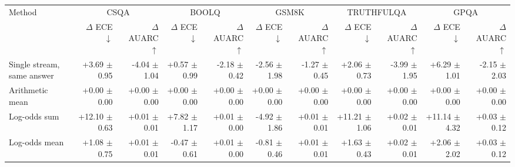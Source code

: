 \begin{tabular}{lrrrrrrrrrr}
\toprule
Method & \multicolumn{2}{c}{CSQA} & \multicolumn{2}{c}{BOOLQ} & \multicolumn{2}{c}{GSM8K} & \multicolumn{2}{c}{TRUTHFULQA} & \multicolumn{2}{c}{GPQA} \\
 & $\Delta$ ECE $\downarrow$ & $\Delta$ AUARC $\uparrow$ & $\Delta$ ECE $\downarrow$ & $\Delta$ AUARC $\uparrow$ & $\Delta$ ECE $\downarrow$ & $\Delta$ AUARC $\uparrow$ & $\Delta$ ECE $\downarrow$ & $\Delta$ AUARC $\uparrow$ & $\Delta$ ECE $\downarrow$ & $\Delta$ AUARC $\uparrow$ \\
\midrule
Single stream, same answer & +3.69 {\scriptsize $\pm$ 0.95} & -4.04 {\scriptsize $\pm$ 1.04} & +0.57 {\scriptsize $\pm$ 0.99} & -2.18 {\scriptsize $\pm$ 0.42} & -2.56 {\scriptsize $\pm$ 1.98} & -1.27 {\scriptsize $\pm$ 0.45} & +2.06 {\scriptsize $\pm$ 0.73} & -3.99 {\scriptsize $\pm$ 1.95} & +6.29 {\scriptsize $\pm$ 1.01} & -2.15 {\scriptsize $\pm$ 2.03} \\
Arithmetic mean & +0.00 {\scriptsize $\pm$ 0.00} & +0.00 {\scriptsize $\pm$ 0.00} & +0.00 {\scriptsize $\pm$ 0.00} & +0.00 {\scriptsize $\pm$ 0.00} & +0.00 {\scriptsize $\pm$ 0.00} & +0.00 {\scriptsize $\pm$ 0.00} & +0.00 {\scriptsize $\pm$ 0.00} & +0.00 {\scriptsize $\pm$ 0.00} & +0.00 {\scriptsize $\pm$ 0.00} & +0.00 {\scriptsize $\pm$ 0.00} \\
Log-odds sum & +12.10 {\scriptsize $\pm$ 0.63} & +0.01 {\scriptsize $\pm$ 0.01} & +7.82 {\scriptsize $\pm$ 1.17} & +0.01 {\scriptsize $\pm$ 0.00} & -4.92 {\scriptsize $\pm$ 1.86} & +0.01 {\scriptsize $\pm$ 0.01} & +11.21 {\scriptsize $\pm$ 1.06} & +0.02 {\scriptsize $\pm$ 0.01} & +11.14 {\scriptsize $\pm$ 4.32} & +0.03 {\scriptsize $\pm$ 0.12} \\
Log-odds mean & +1.08 {\scriptsize $\pm$ 0.75} & +0.01 {\scriptsize $\pm$ 0.01} & -0.47 {\scriptsize $\pm$ 0.61} & +0.01 {\scriptsize $\pm$ 0.00} & -0.81 {\scriptsize $\pm$ 0.46} & +0.01 {\scriptsize $\pm$ 0.01} & +1.63 {\scriptsize $\pm$ 0.43} & +0.02 {\scriptsize $\pm$ 0.01} & +2.06 {\scriptsize $\pm$ 2.02} & +0.03 {\scriptsize $\pm$ 0.12} \\

\end{tabular}
